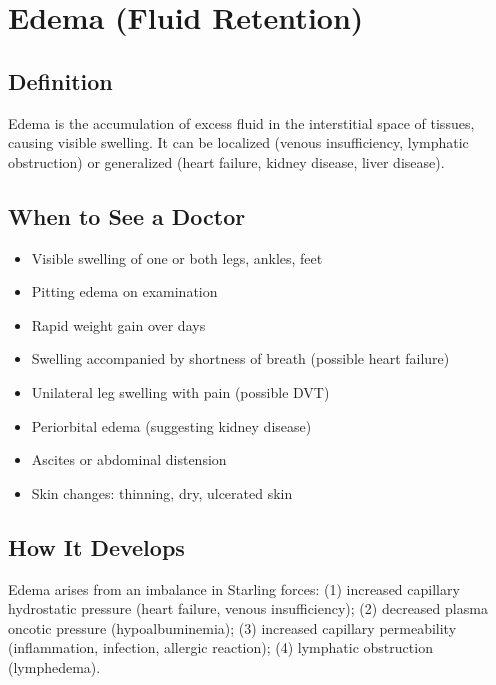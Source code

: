 \chapter{Edema (Fluid Retention)}

\section*{Definition}
Edema is the accumulation of excess fluid in the interstitial space of tissues, causing visible swelling. It can be localized (venous insufficiency, lymphatic obstruction) or generalized (heart failure, kidney disease, liver disease).

\section*{When to See a Doctor}
\begin{itemize}
\item Visible swelling of one or both legs, ankles, feet
\item Pitting edema on examination
\item Rapid weight gain over days
\item Swelling accompanied by shortness of breath (possible heart failure)
\item Unilateral leg swelling with pain (possible DVT)
\item Periorbital edema (suggesting kidney disease)
\item Ascites or abdominal distension
\item Skin changes: thinning, dry, ulcerated skin
\end{itemize}

\section*{How It Develops}
Edema arises from an imbalance in Starling forces: (1) increased capillary hydrostatic pressure (heart failure, venous insufficiency); (2) decreased plasma oncotic pressure (hypoalbuminemia); (3) increased capillary permeability (inflammation, infection, allergic reaction); (4) lymphatic obstruction (lymphedema).

